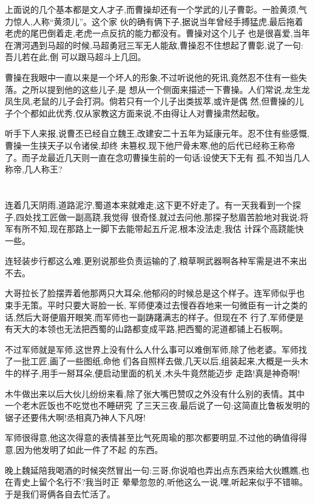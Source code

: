 ﻿\documentclass[12pt,twocolumn]{article}
\begin{document}
上面说的几个基本都是文人才子,而曹操却还有一个学武的儿子曹彰。一脸黄须,气力惊人,人称``黄须儿''。这个家
伙的确有俩下子,据说当年曾经手搏猛虎,最后拖着老虎的尾巴倒着走,老虎一点反抗的能力都没有。曹操对这个儿子
也是很喜爱,当年在渭河遇到马超的时候,马超勇冠三军无人能敌,曹操忍不住想起了曹彰,说了一句:吾儿若在此,倒
可以跟马超斗上几回。

曹操在我眼中一直以来是一个坏人的形象,不过听说他的死讯,竟然忍不住有一些失落。之所以提到他的这些儿子,是
想从一个侧面来描述一下曹操。人们常说,龙生龙凤生凤,老鼠的儿子会打洞。倘若只有一个儿子出类拔萃,或许是偶
然,但曹操的儿子个个都如此优秀,仅从家教这方面来说,不由得让人对曹操肃然起敬。

听手下人来报,说曹丕已经自立魏王,改建安二十五年为延康元年。忍不住有些感慨,曹操一生挟天子以令诸侯,却终
未篡权,现下他尸骨未寒,他的后代已经称王称帝了。而子龙最近几天则一直在念叨曹操生前的一句话:设使天下无有
孤,不知当几人称帝,几人称王?

\section{}

连着几天阴雨,道路泥泞,蜀道本来就难走,这下更不好走了。有一天我看到一个探子,四处找工匠做一副高跷,我觉得
很奇怪,就过去问他,那探子愁眉苦脸地对我说:将军有所不知,现在那路上一脚下去能带起五斤泥,根本没法走,我估
计踩个高跷能快一些。

连轻装步行都这么难,更别说那些负责运输的了,粮草啊武器啊各种军需是进不来出不去。

大哥拉长了脸摆弄着他那两只大耳朵,他郁闷的时候总是这个样子。连军师似乎也束手无策。平时只要大哥脸一长,
军师便凑过去慢吞吞地来一句微臣有一计之类的话,然后大哥便眉开眼笑,而军师也一副踌躇满志的样子。但现在不
行了,军师便是有天大的本领也无法把西蜀的山路都变成平路,把西蜀的泥道都铺上石板啊。

不过军师就是军师,这世界上没有什么人什么事可以难倒军师,除了他老婆。军师找了一批工匠,画了一些图纸,命他
们各自照样去做,几天以后,组装起来,大概是一头木牛的样子,用手一掰耳朵,便启动里面的机关,木头牛竟然能迈步
走路!真是神奇啊!

木牛做出来以后大伙儿纷纷来看,除了张大嘴巴赞叹之外没有什么别的表情。其中一个老木匠饭也不吃觉也不睡研究
了三天三夜,最后说了一句:这简直比鲁板发明的锯子还要伟大啊!丞相真乃神人下凡呀!

军师很得意,他这次得意的表情甚至比气死周瑜的那次都要明显,不过他的确值得得意,因为他发明了如此一件了不起
的东西。

晚上魏延陪我喝酒的时候突然冒出一句:三哥,你说咱也弄出点东西来给大伙瞧瞧,也在青史上留个名行不?我当时正
晕晕忽忽的,听他这么一说,嘿,听起来似乎不错嘛。于是我们哥俩各自去忙活了。
\end{document}

